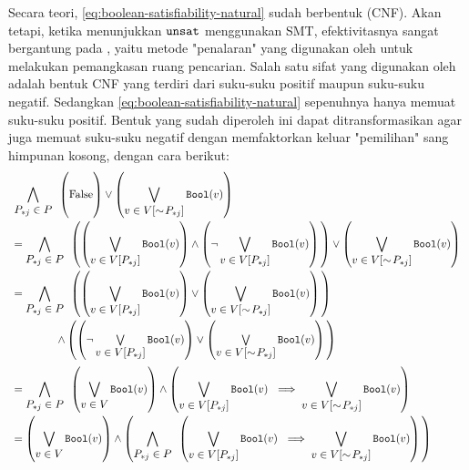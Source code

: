 Secara teori,  \autoref{eq:boolean-satisfiability-natural} sudah berbentuk  (CNF). Akan tetapi, ketika menunjukkan \(\mathtt{unsat}\) menggunakan SMT, efektivitasnya sangat bergantung pada , yaitu metode "penalaran" yang digunakan oleh  untuk melakukan pemangkasan ruang pencarian. Salah satu sifat yang digunakan oleh  adalah bentuk CNF yang terdiri dari suku-suku positif maupun suku-suku negatif. Sedangkan \autoref{eq:boolean-satisfiability-natural} sepenuhnya hanya memuat suku-suku positif. Bentuk yang sudah diperoleh ini dapat ditransformasikan agar juga memuat suku-suku negatif dengan memfaktorkan keluar "pemilihan" sang himpunan kosong, dengan cara berikut:
\begin{equation}
	\begin{array}{l}
		\displaystyle \bigwedge \limits_{\displaystyle P_{*j} \in P} \enspace \combine{\left(}{\False}{\right)}{\vee}{\left(}{\bigvee \limits_{\displaystyle v \in V[\sim\!P_{*j}]} \boolmap(v)}{\right)} \\ [18pt]
		\displaystyle = \bigwedge \limits_{\displaystyle P_{*j} \in P} \enspace \combine{\left(}{\combine{\left(}{\bigvee \limits_{\displaystyle v \in V[P_{*j}]} \boolmap(v)}{\right)}{\wedge}{\left(}{\neg \bigvee \limits_{\displaystyle v \in V[P_{*j}]} \boolmap(v)}{\right)}}{\right)}{\vee}{\left(}{\bigvee \limits_{\displaystyle v \in V[\sim\!P_{*j}]} \boolmap(v)}{\right)} \\ [18pt]
		\displaystyle = \bigwedge \limits_{\displaystyle P_{*j} \in P} \enspace \combine{\left(}{\combine{\left(}{\bigvee \limits_{\displaystyle v \in V[P_{*j}]} \boolmap(v)}{\right)}{\vee}{\left(}{\bigvee \limits_{\displaystyle v \in V[\sim\!P_{*j}]} \boolmap(v)}{\right)}}{\right)}{\\[18pt]\qquad\qquad\wedge}{\left(}{\combine{\left(}{\neg \bigvee \limits_{\displaystyle v \in V[P_{*j}]} \boolmap(v)}{\right)}{\vee}{\left(}{\bigvee \limits_{\displaystyle v \in V[\sim\!P_{*j}]} \boolmap(v)}{\right)}}{\right)} \\ [18pt]
		\displaystyle = \bigwedge \limits_{\displaystyle P_{*j} \in P} \enspace \combine{\left(}{\bigvee \limits_{\displaystyle v \in V} \boolmap(v)}{\right)}{\wedge}{\left(}{\bigvee \limits_{\displaystyle v \in V[P_{*j}]} \boolmap(v)\ \implies \bigvee \limits_{\displaystyle v \in V[\sim\!P_{*j}]} \boolmap(v)}{\right)} \\ [18pt]
		\displaystyle = \combine{\left(}{\bigvee \limits_{\displaystyle v \in V} \boolmap(v)}{\right)}{\wedge}{\left(}{\bigwedge \limits_{\displaystyle P_{*j} \in P} \enspace \left( \bigvee \limits_{\displaystyle v \in V[P_{*j}]} \boolmap(v)\ \implies \bigvee \limits_{\displaystyle v \in V[\sim\!P_{*j}]} \boolmap(v) \right)}{\right)} \\ [18pt]
	\end{array}
	\label{eq:boolean-satisfiability}
\end{equation}

